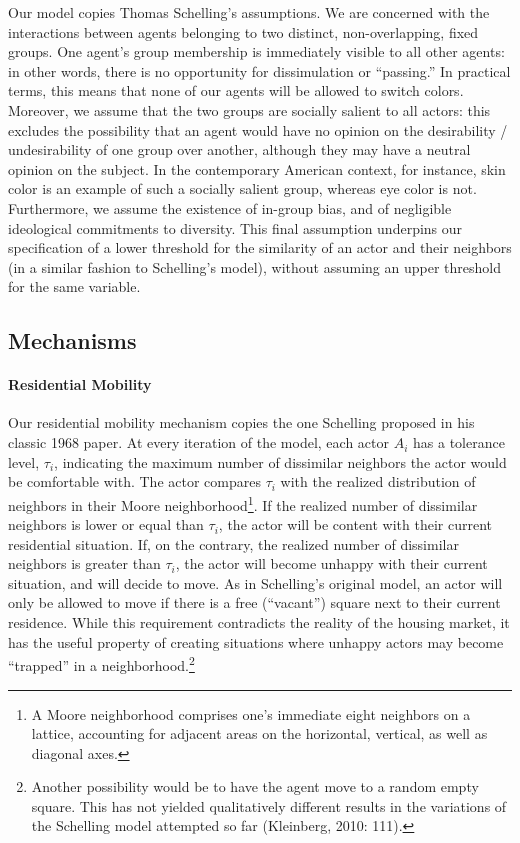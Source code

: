 \documentclass[a4paper,10pt]{article}
\begin{document}
Our model copies Thomas Schelling's assumptions. We are concerned with the interactions between agents belonging to two distinct, non-overlapping, fixed groups. One agent's group membership is immediately visible to all other agents: in other words, there is no opportunity for dissimulation or ``passing.'' In practical terms, this means that none of our agents will be allowed to switch colors. Moreover, we assume that the two groups are socially salient to all actors: this excludes the possibility that an agent would have no opinion on the desirability / undesirability of one group over another, although they may have a neutral opinion on the subject. In the contemporary American context, for instance, skin color is an example of such a socially salient group, whereas eye color is not. Furthermore, we assume the existence of in-group bias, and of negligible ideological commitments to diversity. This final assumption underpins our specification of a lower threshold for the similarity of an actor and their neighbors (in a similar fashion to Schelling's model), without assuming an upper threshold for the same variable. 

\subsection{Mechanisms}

\paragraph{Residential Mobility} Our residential mobility mechanism copies the one Schelling proposed in his classic 1968 paper. At every iteration of the model, each actor $A_i$ has a tolerance level, $\tau_i$, indicating the maximum number of dissimilar neighbors the actor would be comfortable with. The actor compares $\tau_i$ with the realized distribution of neighbors in their Moore neighborhood\footnote{A Moore neighborhood comprises one's immediate eight neighbors on a lattice, accounting for adjacent areas on the horizontal, vertical, as well as diagonal axes.}. If the realized number of dissimilar neighbors is lower or equal than $\tau_i$, the actor will be content with their current residential situation. If, on the contrary, the realized number of dissimilar neighbors is greater than $\tau_i$, the actor will become unhappy with their current situation, and will decide to move. As in Schelling's original model, an actor will only be allowed to move if there is a free (``vacant'') square next to their current residence. While this requirement contradicts the reality of the housing market, it has the useful property of creating situations where unhappy actors may become ``trapped'' in a neighborhood.\footnote{Another possibility would be to have the agent move to a random empty square. This has not yielded qualitatively different results in the variations of the Schelling model attempted so far (Kleinberg, 2010: 111).} 
\end{document}

